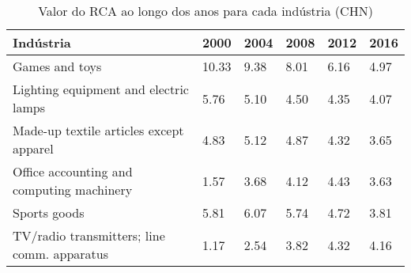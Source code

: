 \begin{table}
\centering
\caption{Valor do RCA ao longo dos anos para cada indústria (CHN)}
\begin{tabular}{p{6cm}p{1.5cm}p{1.5cm}p{1.5cm}p{1.5cm}p{1.5cm}}
\toprule
                                  Indústria &  2000 & 2004 & 2008 & 2012 & 2016 \\
\midrule
                             Games and toys & 10.33 & 9.38 & 8.01 & 6.16 & 4.97 \\
      Lighting equipment and electric lamps &  5.76 & 5.10 & 4.50 & 4.35 & 4.07 \\
    Made-up textile articles except apparel &  4.83 & 5.12 & 4.87 & 4.32 & 3.65 \\
  Office accounting and computing machinery &  1.57 & 3.68 & 4.12 & 4.43 & 3.63 \\
                               Sports goods &  5.81 & 6.07 & 5.74 & 4.72 & 3.81 \\
TV/radio transmitters; line comm. apparatus &  1.17 & 2.54 & 3.82 & 4.32 & 4.16 \\
\bottomrule
\end{tabular}
\end{table}
